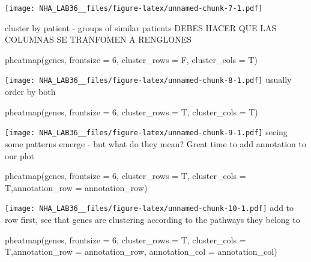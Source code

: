 \documentclass[
]{article}
\newenvironment{Shaded}{\begin{snugshade}}{\end{snugshade}}
\newcommand{\AttributeTok}[1]{\textcolor[rgb]{0.77,0.63,0.00}{#1}}
\newcommand{\DecValTok}[1]{\textcolor[rgb]{0.00,0.00,0.81}{#1}}
\newcommand{\FunctionTok}[1]{\textcolor[rgb]{0.00,0.00,0.00}{#1}}
\newcommand{\NormalTok}[1]{#1}
\begin{document}
\texttt{[image: NHA\_LAB36\_\_files/figure-latex/unnamed-chunk-7-1.pdf]}

cluster by patient - groups of similar patients DEBES HACER QUE LAS
COLUMNAS SE TRANFOMEN A RENGLONES

\begin{Shaded}
\begin{Highlighting}[]
\FunctionTok{pheatmap}\NormalTok{(genes, }\AttributeTok{frontsize =} \DecValTok{6}\NormalTok{, }\AttributeTok{cluster\_rows =}\NormalTok{ F, }\AttributeTok{cluster\_cols =}\NormalTok{ T)}
\end{Highlighting}
\end{Shaded}

\texttt{[image: NHA\_LAB36\_\_files/figure-latex/unnamed-chunk-8-1.pdf]}
usually order by both

\begin{Shaded}
\begin{Highlighting}[]
\FunctionTok{pheatmap}\NormalTok{(genes, }\AttributeTok{frontsize =} \DecValTok{6}\NormalTok{, }\AttributeTok{cluster\_rows =}\NormalTok{ T, }\AttributeTok{cluster\_cols =}\NormalTok{ T)}
\end{Highlighting}
\end{Shaded}

\texttt{[image: NHA\_LAB36\_\_files/figure-latex/unnamed-chunk-9-1.pdf]}
seeing some patterns emerge - but what do they mean? Great time to add
annotation to our plot

\begin{Shaded}
\begin{Highlighting}[]
\FunctionTok{pheatmap}\NormalTok{(genes, }\AttributeTok{frontsize =} \DecValTok{6}\NormalTok{, }\AttributeTok{cluster\_rows =}\NormalTok{ T, }\AttributeTok{cluster\_cols =}\NormalTok{ T,}\AttributeTok{annotation\_row =}\NormalTok{ annotation\_row)}
\end{Highlighting}
\end{Shaded}

\texttt{[image: NHA\_LAB36\_\_files/figure-latex/unnamed-chunk-10-1.pdf]}
add to row first, see that genes are clustering according to the
pathways they belong to

\begin{Shaded}
\begin{Highlighting}[]
\FunctionTok{pheatmap}\NormalTok{(genes, }\AttributeTok{frontsize =} \DecValTok{6}\NormalTok{, }\AttributeTok{cluster\_rows =}\NormalTok{ T, }\AttributeTok{cluster\_cols =}\NormalTok{ T,}\AttributeTok{annotation\_row =}\NormalTok{ annotation\_row, }\AttributeTok{annotation\_col =}\NormalTok{ annotation\_col)}
\end{Highlighting}
\end{Shaded}
\end{document}
